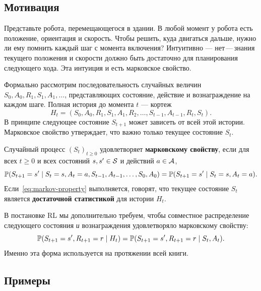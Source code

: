 \subsection*{Мотивация}

Представьте робота, перемещающегося в здании. В любой момент у робота есть положение, ориентация и скорость. Чтобы решить, куда двигаться дальше, нужно ли ему помнить каждый шаг с момента включения? Интуитивно — нет\,---\,знания текущего положения и скорости должно быть достаточно для планирования следующего хода. Эта интуиция и есть марковское свойство.

Формально рассмотрим последовательность случайных величин $S_0, A_0, R_1, S_1, A_1, \dots$, представляющих состояние, действие и вознаграждение на каждом шаге. Полная история до момента $t$ — кортеж
\[
H_t = (S_0, A_0, R_1, S_1, A_1, R_2, \ldots, S_{t-1}, A_{t-1}, R_t, S_t).
\]
В принципе следующее состояние $S_{t+1}$ может зависеть от всей этой истории. Марковское свойство утверждает, что важно только текущее состояние $S_t$.

\begin{definition}
\label{def:markov-property}
Случайный процесс $(S_t)_{t \ge 0}$ удовлетворяет \textbf{марковскому свойству}, если для всех $t \ge 0$ и всех состояний $s, s' \in \mathcal{S}$ и действий $a \in \mathcal{A}$,
\begin{equation}
\label{eq:markov-property}
\mathbb{P}(S_{t+1} = s' \mid S_t = s, A_t = a, S_{t-1}, A_{t-1}, \ldots, S_0, A_0)
= \mathbb{P}(S_{t+1} = s' \mid S_t = s, A_t = a).
\end{equation}
Если~\eqref{eq:markov-property} выполняется, говорят, что текущее состояние $S_t$ является \textbf{достаточной статистикой} для истории $H_t$.
\end{definition}

\begin{remark}
В постановке RL мы дополнительно требуем, чтобы совместное распределение следующего состояния \emph{и} вознаграждения удовлетворяло марковскому свойству:
\[
\mathbb{P}(S_{t+1} = s', R_{t+1} = r \mid H_t) = \mathbb{P}(S_{t+1} = s', R_{t+1} = r \mid S_t, A_t).
\]
Именно эта форма используется на протяжении всей книги.
\end{remark}

\subsection*{Примеры}

